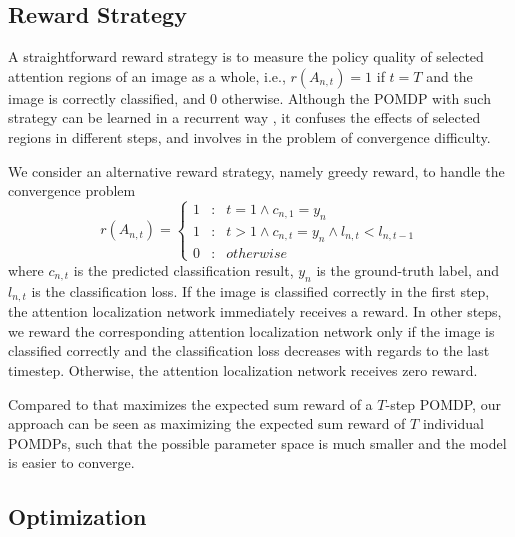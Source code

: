 \documentclass[10pt,twocolumn,letterpaper]{article}
\begin{document}
\subsection{Reward Strategy}
A straightforward reward strategy is to measure the policy quality of selected attention regions of an image as a whole, i.e., $r(A_{n,t}) = 1$  if $t = T$ and the image is correctly classified, and 0 otherwise. Although the POMDP with such strategy can be learned in a recurrent way \cite{bd1}, it confuses the effects of selected regions in different steps, and involves in the problem of convergence difficulty.

We consider an alternative reward strategy, namely greedy reward, to handle the convergence problem
\begin{equation}
r(A_{n,t})=\left\{\begin{array}{ccc} 1 & : & t = 1 \wedge c_{n,1} = y_{n} \\ 1 &:& t > 1 \wedge c_{n,t} = y_{n} \wedge l_{n,t} < l_{n,t-1} \\ 0&:& otherwise   \end{array}\right.
\end{equation}
where $c_{n,t}$ is the predicted classification result, $y_{n}$ is the ground-truth label, and $l_{n,t}$ is the classification loss. If the image is classified correctly in the first step, the attention localization network immediately receives a reward. In other steps, we reward the corresponding attention localization network only if the image is classified correctly and the classification loss decreases with regards to the last timestep.
Otherwise, the attention localization network receives zero reward.

Compared to \cite{bd1} that maximizes the expected sum reward of a $T$-step POMDP, our approach can be seen as maximizing the expected sum reward of $T$ individual POMDPs, such that the possible parameter space is much smaller and the model is easier to converge.

\subsection{Optimization}
\end{document}
